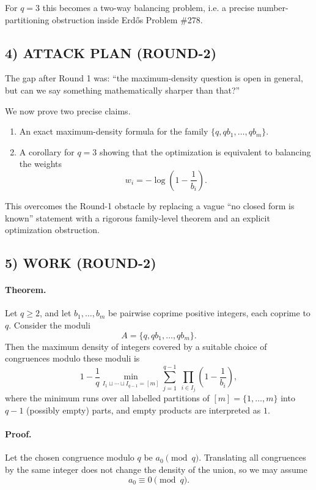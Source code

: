 For $q=3$ this becomes a two-way balancing problem, i.e. a precise number-partitioning obstruction inside Erd\H{o}s Problem \#278.

\subsection*{4) ATTACK PLAN (ROUND-2)}

The gap after Round 1 was: ``the maximum-density question is open in general, but can we say something mathematically sharper than that?''

We now prove two precise claims.

\begin{enumerate}
\item An exact maximum-density formula for the family $\{q,qb_1,\dots,qb_m\}$.
\item A corollary for $q=3$ showing that the optimization is equivalent to balancing the weights
\[
w_i=-\log\!\left(1-\frac{1}{b_i}\right).
\]
\end{enumerate}

This overcomes the Round-1 obstacle by replacing a vague ``no closed form is known'' statement with a rigorous family-level theorem and an explicit optimization obstruction.

\subsection*{5) WORK (ROUND-2)}

\paragraph{Theorem.}
Let $q\ge 2$, and let $b_1,\dots,b_m$ be pairwise coprime positive integers, each coprime to $q$. Consider the moduli
\[
A=\{q,qb_1,\dots,qb_m\}.
\]
Then the maximum density of integers covered by a suitable choice of congruences modulo these moduli is
\[
1-\frac{1}{q}\min_{I_1\sqcup\cdots\sqcup I_{q-1}=[m]}
\sum_{j=1}^{q-1}\ \prod_{i\in I_j}\left(1-\frac{1}{b_i}\right),
\]
where the minimum runs over all labelled partitions of $[m]=\{1,\dots,m\}$ into $q-1$ (possibly empty) parts, and empty products are interpreted as $1$.

\paragraph{Proof.}
Let the chosen congruence modulo $q$ be $a_0 \pmod q$. Translating all congruences by the same integer does not change the density of the union, so we may assume
\[
a_0\equiv 0 \pmod q.
\]

